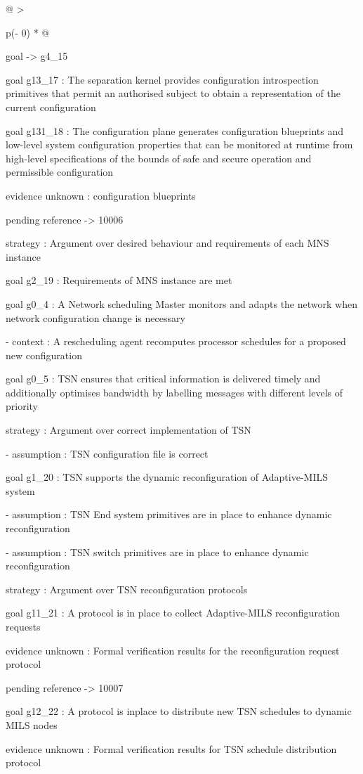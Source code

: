\documentclass[12pt,twoside,a4paper]{article}
\begin{document}
\begin{longtable}[]{@{}
  >{\raggedright\arraybackslash}p{(\columnwidth - 0\tabcolsep) * }@{}}
\begin{minipage}[b]{\linewidth}
goal -\textgreater{} g4\_15

goal g13\_17 : The separation kernel provides configuration introspection primitives that permit an authorised subject to obtain a representation of the current configuration

goal g131\_18 : The configuration plane generates configuration blueprints and low-level system configuration properties that can be monitored at runtime from high-level specifications of the bounds of safe and secure operation and permissible configuration

evidence unknown : configuration blueprints

pending reference -\textgreater{} 10006

strategy : Argument over desired behaviour and requirements of each MNS instance

goal g2\_19 : Requirements of MNS instance are met

goal g0\_4 : A Network scheduling Master monitors and adapts the network when network configuration change is necessary

- context : A rescheduling agent recomputes processor schedules for a proposed new configuration

goal g0\_5 : TSN ensures that critical information is delivered timely and additionally optimises bandwidth by labelling messages with different levels of priority

strategy : Argument over correct implementation of TSN

- assumption : TSN configuration file is correct

goal g1\_20 : TSN supports the dynamic reconfiguration of Adaptive-MILS system

- assumption : TSN End system primitives are in place to enhance dynamic reconfiguration

- assumption : TSN switch primitives are in place to enhance dynamic reconfiguration

strategy : Argument over TSN reconfiguration protocols

goal g11\_21 : A protocol is in place to collect Adaptive-MILS reconfiguration requests

evidence unknown : Formal verification results for the reconfiguration request protocol

pending reference -\textgreater{} 10007

goal g12\_22 : A protocol is inplace to distribute new TSN schedules to dynamic MILS nodes

evidence unknown : Formal verification results for TSN schedule distribution protocol


\end{minipage}
\end{longtable}
\end{document}
